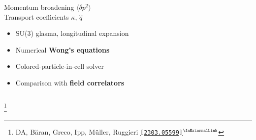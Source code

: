 \documentclass[aspectratio=169,11pt,usenames,dvipsnames]{beamer}
\renewcommand{\thefootnote}{\color{customblue}\faPaperPlaneO}
\newcommand\blfootnote[1]{%
  \begingroup
  \renewcommand\thefootnote{}\footnote{#1}%
  \addtocounter{footnote}{-1}%
  \endgroup
}
\begin{document}
\begin{frame}[t,noframenumbering]
\begin{columns}[onlytextwidth,t]
        \begin{center}
            {\Large\color{palteal} Momentum broadening $\langle \delta p^2\rangle$\\[5pt]
            Transport coefficients $\kappa$, $\hat{q}$  \\[10pt]}
            \footnotesize
                \begin{itemize}
                    \item {\color{lightgray}SU(3) glasma, longitudinal expansion}
                    \item {\color{lightgray}Numerical {\bfseries Wong's equations}}
                    \item {\color{lightgray}Colored-particle-in-cell solver}
                    \item {\color{lightgray}Comparison with {\bfseries field correlators}}
                \end{itemize}
        \end{center}
    \end{columns}
    \blfootnote{\scriptsize DA, Băran, Greco, Ipp, Müller, Ruggieri \href{https://arxiv.org/abs/2303.05599}{\color{palgold}\texttt{[2303.05599]}$^\text{\scalebox{0.9}{\faExternalLink}}$}}
\end{frame}



\end{document}
